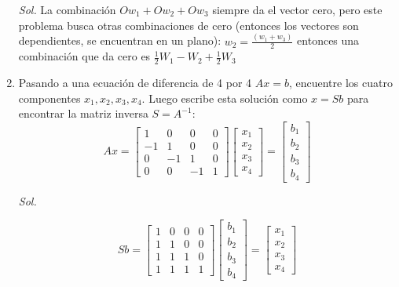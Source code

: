 \begin{enumerate}
	      \textit{ Sol. }
	      La combinación $Ow_1+ Ow_2+ Ow_{3}$ siempre da el vector cero, pero este problema
	      busca otras combinaciones de cero (entonces los vectores son dependientes, se encuentran en un plano):
	      $w_2= \frac{(w_1+ w_{3})}{2}$ entonces una combinación que da cero es $\frac{1}{2}W_1- W_2+ \frac{1}{2}W_{3}$

	\item Pasando a una ecuación de diferencia de 4 por 4 $Ax = b$, encuentre los cuatro componentes $x_{1}, x_2 ,
		      x_{3}, x_{4}$. Luego escribe esta solución como $x = Sb$ para encontrar la matriz inversa $S = A^{-1}$:
	      \begin{equation*}
		      Ax= \begin{bmatrix}
			      1  & 0  & 0  & 0 \\
			      -1 & 1  & 0  & 0 \\
			      0  & -1 & 1  & 0 \\
			      0  & 0  & -1 & 1
		      \end{bmatrix} \begin{bmatrix}
			      x_1\\
			      x_2\\
			      x_3 \\
			      x_{4}
		      \end{bmatrix}=\begin{bmatrix}
			      b_1\\
			      b_2\\
			      b_3 \\
			      b_{4}
		      \end{bmatrix}
	      \end{equation*}

	      \textit{ Sol. }

	      \begin{equation}
		      Sb= \begin{bmatrix}
			      1 & 0 & 0 & 0 \\
			      1 & 1 & 0 & 0 \\
			      1 & 1 & 1 & 0 \\
			      1 & 1 & 1 & 1\end{bmatrix}\begin{bmatrix}
			      b_1\\
			      b_2\\
			      b_3 \\
			      b_{4}
		      \end{bmatrix}= \begin{bmatrix}
			      x_1\\
			      x_2\\
			      x_3 \\
			      x_{4}
		      \end{bmatrix}
	      \end{equation}


\end{enumerate}
